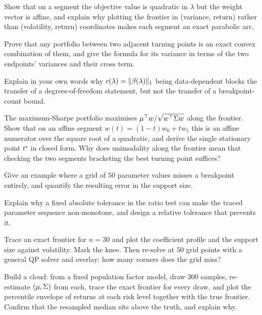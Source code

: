 \begin{exercises}

\begin{exercise}
Show that on a segment the objective value is quadratic in $\lambda$ but the weight
vector is affine, and explain why plotting the frontier in
(variance, return) rather than (volatility, return) coordinates makes each segment an
exact parabolic arc.
\end{exercise}

\begin{exercise}
Prove that any portfolio between two adjacent turning points is an exact convex
combination of them, and give the formula for its variance in terms of the two
endpoints' variances and their cross term.
\end{exercise}

\begin{exercise}
Explain in your own words why $c(\lambda) = \lVert \beta(\lambda) \rVert_1$ being
data-dependent blocks the transfer of a degrees-of-freedom statement, but not the
transfer of a breakpoint-count bound.
\end{exercise}

\begin{exercise}
The maximum-Sharpe portfolio maximises $\mu^{\top} w / \sqrt{w^{\top}\Sigma w}$ along the
frontier. Show that on an affine segment $w(t) = (1-t)w_0 + tw_1$ this is an affine
numerator over the square root of a quadratic, and derive the single stationary point
$t^\star$ in closed form. Why does unimodality along the frontier mean that checking
the two segments bracketing the best turning point suffices?
\end{exercise}

\begin{exercise}
Give an example where a grid of $50$ parameter values misses a breakpoint entirely,
and quantify the resulting error in the support size.
\end{exercise}

\begin{exercise}
Explain why a fixed absolute tolerance in the ratio test can make the traced parameter
sequence non-monotone, and design a relative tolerance that prevents it.
\end{exercise}

\begin{exercise}[Implementation]
Trace an exact frontier for $n = 30$ and plot the coefficient profile and the support
size against volatility. Mark the knee. Then re-solve at $50$ grid points with a
general QP solver and overlay: how many corners does the grid miss?
\end{exercise}

\begin{exercise}[Implementation]
Build a cloud: from a fixed population factor model, draw $300$ samples, re-estimate
$(\mu,\Sigma)$ from each, trace the exact frontier for every draw, and plot the
percentile envelope of returns at each risk level together with the true frontier.
Confirm that the resampled median sits above the truth, and explain why.
\end{exercise}

\end{exercises}
